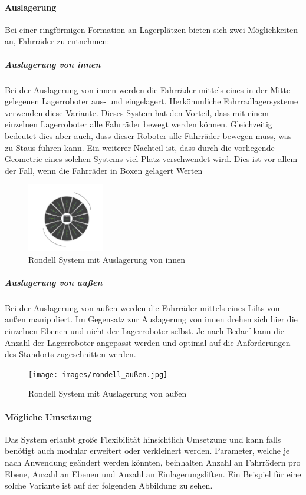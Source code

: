 \paragraph{Auslagerung} Bei einer ringförmigen Formation an Lagerplätzen bieten sich zwei Möglichkeiten an, Fahrräder zu entnehmen:

\subparagraph{Auslagerung von innen} Bei der Auslagerung von innen werden die Fahrräder mittels eines in der Mitte gelegenen Lagerroboter aus- und eingelagert. Herkömmliche Fahrradlagersysteme verwenden diese Variante. Dieses System hat den Vorteil, dass mit einem einzelnen Lagerroboter alle Fahrräder bewegt werden können. Gleichzeitig bedeutet dies aber auch, dass dieser Roboter alle Fahrräder bewegen muss, was zu Staus führen kann. Ein weiterer Nachteil ist, dass durch die vorliegende Geometrie eines solchen Systems viel Platz verschwendet wird. Dies ist vor allem der Fall, wenn die Fahrräder in Boxen gelagert Werten

\begin{figure}
  \centering
  \includegraphics[width=0.3\textwidth]{images/rondell_innen.jpg}
  \caption{Rondell System mit Auslagerung von innen}
  \label{fig:rondell_innen}
\end{figure}

\subparagraph{Auslagerung von außen} Bei der Auslagerung von außen werden die Fahrräder mittels eines Lifts von außen manipuliert. Im Gegensatz zur Auslagerung von innen drehen sich hier die einzelnen Ebenen und nicht der Lagerroboter selbst. Je nach Bedarf kann die Anzahl der Lagerroboter angepasst werden und optimal auf die Anforderungen des Standorts zugeschnitten werden.

\begin{figure}
  \centering
  \texttt{[image: images/rondell\_außen.jpg]}
  \caption{Rondell System mit Auslagerung von außen}
  \label{fig:rondell_außen}
\end{figure}

\paragraph{Mögliche Umsetzung} Das System erlaubt große Flexibilität hinsichtlich Umsetzung und kann falls benötigt auch modular erweitert oder verkleinert werden. Parameter, welche je nach Anwendung geändert werden könnten, beinhalten Anzahl an Fahrrädern pro Ebene, Anzahl an Ebenen und Anzahl an Einlagerungsliften. Ein Beispiel für eine solche Variante ist auf der folgenden Abbildung zu sehen.

